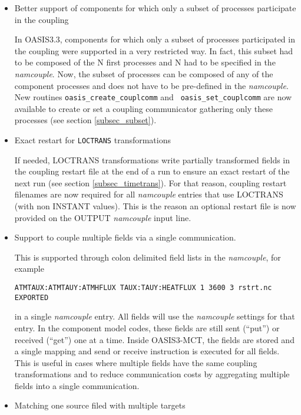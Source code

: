 \begin{itemize}

\item Better support of components for which only a subset of processes
  participate in the coupling

In OASIS3.3, components for which only a subset of processes
  participated in the coupling were supported in a very restricted
  way. In fact, this subset had to be composed of the N first
  processes and N had to be specified in the {\it namcouple}. Now, the
  subset of processes can be composed of any of the component
  processes and does not have to be pre-defined in the {\it
    namcouple}. New routines {\tt oasis\_create\_couplcomm} and {\tt
  oasis\_set\_couplcomm} are now available to create or set a coupling
  communicator gathering only these processes (see section \ref{subsec_subset}).

\item Exact restart for {\tt LOCTRANS} transformations

If needed, LOCTRANS transformations write partially
  transformed fields  in the coupling restart file at the end of a run
  to ensure an exact restart of the next run (see section
  \ref{subsec_timetrans}). For that
  reason, coupling restart filenames are now required for all {\it
    namcouple} entries that use LOCTRANS (with non INSTANT
  values). This is the reason an optional restart file is now provided
  on the OUTPUT {\it namcouple} input line.

\item Support to couple multiple fields via a single communication.

 This is supported through colon
delimited field lists in the {\it namcouple}, for example 

{\tt ATMTAUX:ATMTAUY:ATMHFLUX  TAUX:TAUY:HEATFLUX 1 3600 3 rstrt.nc EXPORTED}

 in a single {\it namcouple} entry. All fields will use the
{\it namcouple} settings for that entry. In the component model codes,
these fields are still sent (``put'') or received (``get'') one at a
time. Inside OASIS3-MCT, the fields are stored and a single mapping
and send or receive instruction is executed for all fields. This is
useful in cases where multiple fields have the same coupling
transformations and to reduce communication costs by aggregating multiple fields into a single communication.

\item Matching one source filed with multiple targets


\end{itemize}
